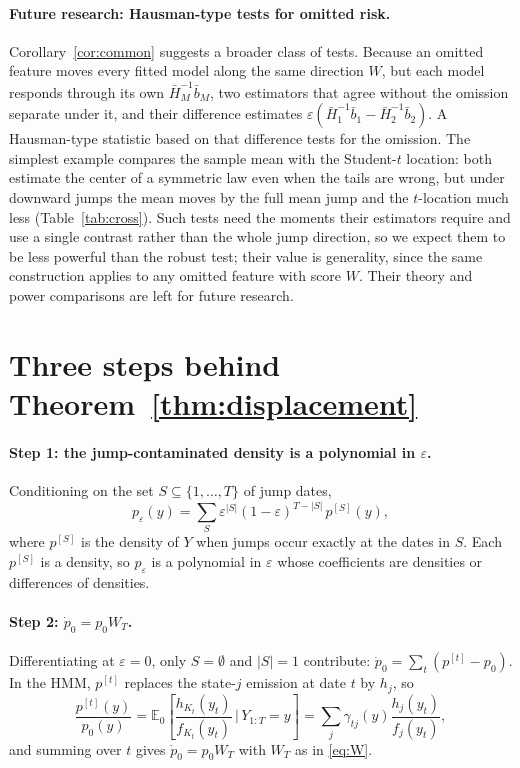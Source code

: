 \documentclass[11pt,a4paper]{article}
\theoremstyle{definition}
\theoremstyle{remark}
\newcommand{\E}{\mathbb{E}}
\begin{document}
\paragraph{Future research: Hausman-type tests for omitted risk.} Corollary~\ref{cor:common} suggests a broader class of tests. Because an omitted feature moves every fitted model along the same direction $W$, but each model responds through its own $\bar H_M^{-1}\bar b_M$, two estimators that agree without the omission separate under it, and their difference estimates $\varepsilon(\bar H_1^{-1}\bar b_1-\bar H_2^{-1}\bar b_2)$. A Hausman-type statistic \citep{hausman1978} based on that difference tests for the omission. The simplest example compares the sample mean with the Student-$t$ location: both estimate the center of a symmetric law even when the tails are wrong, but under downward jumps the mean moves by the full mean jump and the $t$-location much less (Table~\ref{tab:cross}). Such tests need the moments their estimators require and use a single contrast rather than the whole jump direction, so we expect them to be less powerful than the robust test; their value is generality, since the same construction applies to any omitted feature with score $W$. Their theory and power comparisons are left for future research.

\appendix
\section{Three steps behind Theorem~\ref{thm:displacement}}\label{app:steps}
\paragraph{Step 1: the jump-contaminated density is a polynomial in $\varepsilon$.} Conditioning on the set $S\subseteq\{1,\dots,T\}$ of jump dates,
\[
p_\varepsilon(y)=\sum_{S}\varepsilon^{|S|}(1-\varepsilon)^{T-|S|}\,p^{[S]}(y),
\]
where $p^{[S]}$ is the density of $Y$ when jumps occur exactly at the dates in $S$. Each $p^{[S]}$ is a density, so $p_\varepsilon$ is a polynomial in $\varepsilon$ whose coefficients are densities or differences of densities.

\paragraph{Step 2: $\dot p_0=p_0W_T$.} Differentiating at $\varepsilon=0$, only $S=\emptyset$ and $|S|=1$ contribute: $\dot p_0=\sum_t(p^{[t]}-p_0)$. In the HMM, $p^{[t]}$ replaces the state-$j$ emission at date $t$ by $h_j$, so
\[
\frac{p^{[t]}(y)}{p_0(y)}=\E_0\!\left[\frac{h_{K_t}(y_t)}{f_{K_t}(y_t)}\,\Big|\,Y_{1:T}=y\right]=\sum_j\gamma_{tj}(y)\frac{h_j(y_t)}{f_j(y_t)},
\]
and summing over $t$ gives $\dot p_0=p_0W_T$ with $W_T$ as in \eqref{eq:W}.
\end{document}
